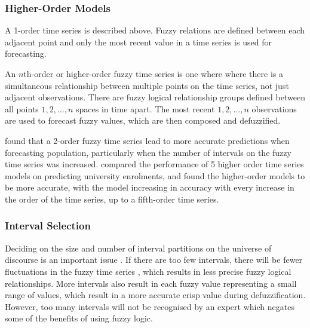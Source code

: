 \documentclass{article}
\theoremstyle{definition}
\begin{document}
\subsubsection{Higher-Order Models}

A 1-order time series is described above. Fuzzy relations are defined between each adjacent point and only the most recent value in a time series is used for forecasting.

An $n$th-order or higher-order fuzzy time series is one where where there is a simultaneous relationship between multiple points on the time series, not just adjacent observations. There are fuzzy logical relationship groups defined between all points $1,2,\ldots,n$ spaces in time apart. The most recent $1,2,\ldots,n$ observations are used to forecast fuzzy values, which are then composed and defuzzified.

\cite{tsai1999study} found that a 2-order fuzzy time series lead to more accurate predictions when forecasting population, particularly when the number of intervals on the fuzzy time series was increased. \cite{tsai2000forecasting} compared the performance of 5 higher order time series models on predicting university enrolments, and found the higher-order models to be more accurate, with the model increasing in accuracy with every increase in the order of the time series, up to a fifth-order time series.

\subsubsection{Interval Selection}

Deciding on the size and number of interval partitions on the universe of discourse is an important issue \citep{Huarng2001effective,  huarng2006ratio}. If there are too few intervals, there will be fewer fluctuations in the fuzzy time series \citep{Huarng2001effective}, which results in less precise fuzzy logical relationships. More intervals also result in each fuzzy value representing a small range of values, which result in a more accurate crisp value during defuzzification. However, too many intervals will not be recognised by an expert which negates some of the benefits of using fuzzy logic.
\end{document}
